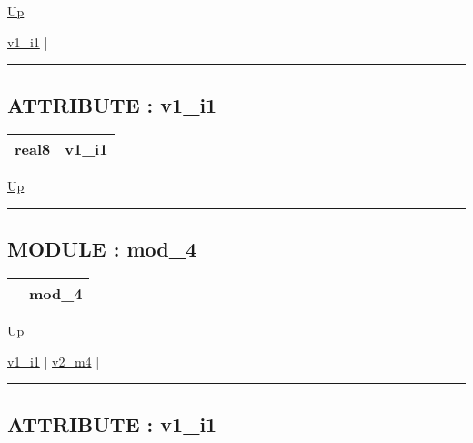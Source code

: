 \hyperlink{ecldoc:intest.in1intest.example_2}{Up}

\par


\hyperlink{ecldoc:intest.in1intest.example_2.iface_1.v1_i1}{v1\_i1}  |

\rule{\textwidth}{0.4pt}

\subsection*{ATTRIBUTE : v1\_i1}
\hypertarget{ecldoc:intest.in1intest.example_2.iface_1.v1_i1}{}

{\renewcommand{\arraystretch}{1.5}
\begin{tabularx}{\textwidth}{|>{\raggedright\arraybackslash}l|X|}
\hline
\hspace{0pt}real8 & v1\_i1 \\
\hline
\end{tabularx}
}

\hyperlink{ecldoc:intest.in1intest.example_2.iface_1}{Up}

\par


\rule{\textwidth}{0.4pt}


\subsection*{MODULE : mod\_4}
\hypertarget{ecldoc:intest.in1intest.example_2.mod_4}{}

{\renewcommand{\arraystretch}{1.5}
\begin{tabularx}{\textwidth}{|>{\raggedright\arraybackslash}l|X|}
\hline
\hspace{0pt} & mod\_4 \\
\hline
\end{tabularx}
}

\hyperlink{ecldoc:intest.in1intest.example_2}{Up}

\par


\hyperlink{ecldoc:intest.in1intest.example_2.mod_4.v1_i1}{v1\_i1}  |
\hyperlink{ecldoc:intest.in1intest.example_2.mod_4.v2_m4}{v2\_m4}  |

\rule{\textwidth}{0.4pt}

\subsection*{ATTRIBUTE : v1\_i1}
\hypertarget{ecldoc:intest.in1intest.example_2.mod_4.v1_i1}{}

